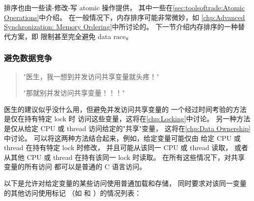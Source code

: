 \QuickQuizEnd

排序也由一些读-修改-写 atomic 操作提供，
其中一些在\cref{sec:toolsoftrade:Atomic Operations}中介绍。
在一般情况下，内存排序可能非常微妙，如
\cref{chp:Advanced Synchronization: Memory Ordering}中所讨论的。
下一节介绍内存排序的一种替代方案，即
限制甚至完全避免 data race。

\subsubsection{避免数据竞争}
\label{sec:toolsoftrade:Avoiding Data Races}

\begin{quote}
"医生，我一想到并发访问共享变量就头疼！"

"那就别并发访问共享变量！！！"
\end{quote}

医生的建议似乎没什么用，但避免并发访问共享变量的
一个经过时间考验的方法是仅在持有特定 lock 时
访问这些变量，这将在\cref{chp:Locking}中讨论。
另一种方法是仅从给定 CPU 或 thread 访问给定的"共享"变量，
这将在\cref{chp:Data Ownership}中讨论。
可以将这两种方法结合起来，例如，给定变量可能仅由
给定 CPU 或 thread 在持有特定 lock 时修改，
并且可能从该同一 CPU 或 thread 读取，
或者从其他 CPU 或 thread 在持有该同一 lock 时读取。
在所有这些情况下，对共享变量的所有访问
都可以是普通的 C 语言访问。

以下是允许对给定变量的某些访问使用普通加载和存储，
同时要求对该同一变量的其他访问使用标记
（如  和 ）的情况列表：

